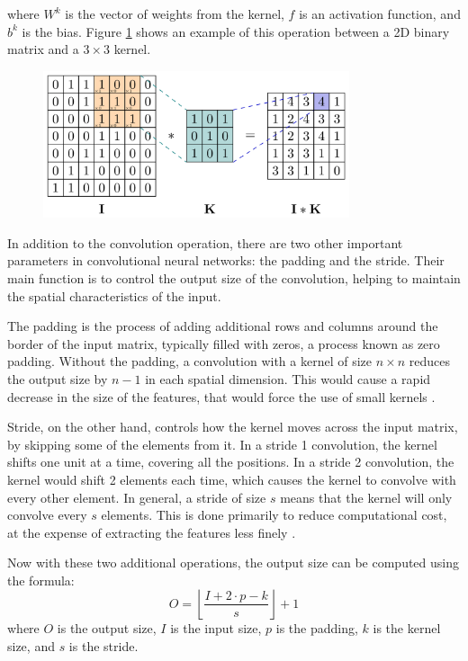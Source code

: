 where $W^k$ is the vector of weights from the kernel, $f$ is an activation function, and $b^k$ is the bias. Figure \ref{fig:conv-example} shows an example of this operation between a 2D binary matrix and a $3\times3$ kernel. 

\begin{figure}[H]
    \centering
    \includegraphics[width=9cm]{Cap2_LitReview/model_basics/Convolutional_NN/conv2d.png}
    \caption{\cite{Riebesell_2022}}
    \label{fig:conv-example}
\end{figure}

In addition to the convolution operation, there are two other important parameters in convolutional neural networks: the padding and the stride. Their main function is to control the output size of the convolution, helping to maintain the spatial characteristics of the input. 

The padding is the process of adding additional rows and columns around the border of the input matrix, typically filled with zeros, a process known as zero padding. Without the padding, a convolution with a kernel of size $n\times n$ reduces the output size by $n-1$ in each spatial dimension. This would cause a rapid decrease in the size of the features, that would force the use of small kernels \cite{Goodfellow_Bengio_Courville_2018}.

Stride, on the other hand, controls how the kernel moves across the input matrix, by skipping some of the elements from it. In a stride 1 convolution, the kernel shifts one unit at a time, covering all the positions. In a stride 2 convolution, the kernel would shift 2 elements each time, which causes the kernel to convolve with every other element. In general, a stride of size $s$ means that the kernel will only convolve every $s$ elements. This is done primarily to reduce computational cost, at the expense of extracting the features less finely \cite{Goodfellow_Bengio_Courville_2018}. 

Now with these two additional operations, the output size can be computed using the formula:
\begin{equation}
    O = \left\lfloor \frac{I + 2 \cdot p - k}{s} \right\rfloor + 1
    \label{eq:conv_output}
\end{equation}
where $O$ is the output size, $I$ is the input size, $p$ is the padding, $k$ is the kernel size, and $s$ is the stride.

